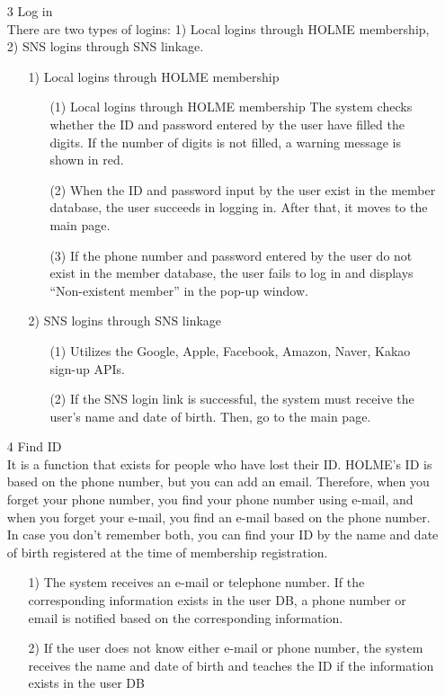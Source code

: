 \documentclass[conference]{IEEEtran}
\begin{document}
\begin{enumerate}
\item[3] Log in\\
There are two types of logins: 1) Local logins through HOLME membership, 2) SNS logins through SNS linkage.
\begin{itemize}
\item [1)] Local logins through HOLME membership
\begin{itemize}
\item [(1)] Local logins through HOLME membership
The system checks whether the ID and password entered by the user have filled the digits. If the number of digits is not filled, a warning message is shown in red.
\item [(2)] When the ID and password input by the user exist in the member database, the user succeeds in logging in. After that, it moves to the main page.
\item [(3)] If the phone number and password entered by the user do not exist in the member database, the user fails to log in and displays ``Non-existent member'' in the pop-up window.
\end{itemize}
\item [2)] SNS logins through SNS linkage 
\begin{itemize}
\item [(1)] Utilizes the Google, Apple, Facebook, Amazon, Naver, Kakao sign-up APIs.
\item [(2)] If the SNS login link is successful, the system must receive the user's name and date of birth. Then, go to the main page.\\
\end{itemize}
\end{itemize}


\item[4] Find ID\\
It is a function that exists for people who have lost their ID. HOLME's ID is based on the phone number, but you can add an email. Therefore, when you forget your phone number, you find your phone number using e-mail, and when you forget your e-mail, you find an e-mail based on the phone number. In case you don't remember both, you can find your ID by the name and date of birth registered at the time of membership registration.
\begin{itemize}
\item [1)]  The system receives an e-mail or telephone number. If the corresponding information exists in the user DB, a phone number or email is notified based on the corresponding information.
\item [2)] If the user does not know either e-mail or phone number, the system receives the name and date of birth and teaches the ID if the information exists in the user DB\\
\end{itemize}



\end{enumerate}
\end{document}

